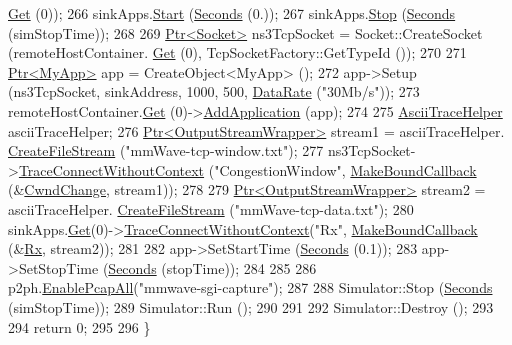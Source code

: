 \begin{DoxyCode}
      \hyperlink{classns3_1_1NodeContainer_a9ed96e2ecc22e0f5a3d4842eb9bf90bf}{Get} (0));
266         sinkApps.\hyperlink{classns3_1_1ApplicationContainer_a8eff87926507020bbe3e1390358a54a7}{Start} (\hyperlink{group__timecivil_ga33c34b816f8ff6628e33d5c8e9713b9e}{Seconds} (0.));
267         sinkApps.\hyperlink{classns3_1_1ApplicationContainer_adfc52f9aa4020c8714679b00bbb9ddb3}{Stop} (\hyperlink{group__timecivil_ga33c34b816f8ff6628e33d5c8e9713b9e}{Seconds} (simStopTime));
268 
269         \hyperlink{classns3_1_1Ptr}{Ptr<Socket>} ns3TcpSocket = Socket::CreateSocket (remoteHostContainer.
      \hyperlink{classns3_1_1NodeContainer_a9ed96e2ecc22e0f5a3d4842eb9bf90bf}{Get} (0), TcpSocketFactory::GetTypeId ());
270 
271         \hyperlink{classns3_1_1Ptr}{Ptr<MyApp>} app = CreateObject<MyApp> ();
272         app->Setup (ns3TcpSocket, sinkAddress, 1000, 500, \hyperlink{classns3_1_1DataRate}{DataRate} (\textcolor{stringliteral}{"30Mb/s"}));
273         remoteHostContainer.\hyperlink{classns3_1_1NodeContainer_a9ed96e2ecc22e0f5a3d4842eb9bf90bf}{Get} (0)->\hyperlink{classns3_1_1Node_ab98b4fdc4aadc86366b80e8a79a53f47}{AddApplication} (app);
274 
275         \hyperlink{classns3_1_1AsciiTraceHelper}{AsciiTraceHelper} asciiTraceHelper;
276         \hyperlink{classns3_1_1Ptr}{Ptr<OutputStreamWrapper>} stream1 = asciiTraceHelper.
      \hyperlink{classns3_1_1AsciiTraceHelper_a44960bf2ca32835024eaedd26d1c4f94}{CreateFileStream} (\textcolor{stringliteral}{"mmWave-tcp-window.txt"});
277         ns3TcpSocket->\hyperlink{classns3_1_1ObjectBase_a1be45f6fd561e75dcac9dfa81b2b81e4}{TraceConnectWithoutContext} (\textcolor{stringliteral}{"CongestionWindow"}, 
      \hyperlink{group__makeboundcallback_ga1725d6362e6065faa0709f7c93f8d770}{MakeBoundCallback} (&\hyperlink{mmwave-tcp-example_8cc_a029700a26394b63e7e4f8fe0dc2a3e0d}{CwndChange}, stream1));
278 
279         \hyperlink{classns3_1_1Ptr}{Ptr<OutputStreamWrapper>} stream2 = asciiTraceHelper.
      \hyperlink{classns3_1_1AsciiTraceHelper_a44960bf2ca32835024eaedd26d1c4f94}{CreateFileStream} (\textcolor{stringliteral}{"mmWave-tcp-data.txt"});
280         sinkApps.\hyperlink{classns3_1_1ApplicationContainer_a9e565807abd4213a56566a7ccd8d7509}{Get}(0)->\hyperlink{classns3_1_1ObjectBase_a1be45f6fd561e75dcac9dfa81b2b81e4}{TraceConnectWithoutContext}(\textcolor{stringliteral}{"Rx"},
      \hyperlink{group__makeboundcallback_ga1725d6362e6065faa0709f7c93f8d770}{MakeBoundCallback} (&\hyperlink{mmwave-tcp-example_8cc_a44926b91325d01c8749a8e4728a65087}{Rx}, stream2));
281 
282         app->SetStartTime (\hyperlink{group__timecivil_ga33c34b816f8ff6628e33d5c8e9713b9e}{Seconds} (0.1));
283         app->SetStopTime (\hyperlink{group__timecivil_ga33c34b816f8ff6628e33d5c8e9713b9e}{Seconds} (stopTime));
284 
285 
286         p2ph.\hyperlink{classns3_1_1PcapHelperForDevice_a4ab183a2512120200d4a0e5d8ececd49}{EnablePcapAll}(\textcolor{stringliteral}{"mmwave-sgi-capture"});
287 
288         Simulator::Stop (\hyperlink{group__timecivil_ga33c34b816f8ff6628e33d5c8e9713b9e}{Seconds} (simStopTime));
289         Simulator::Run ();
290 
291 
292         Simulator::Destroy ();
293 
294         \textcolor{keywordflow}{return} 0;
295 
296 \}
\end{DoxyCode}


